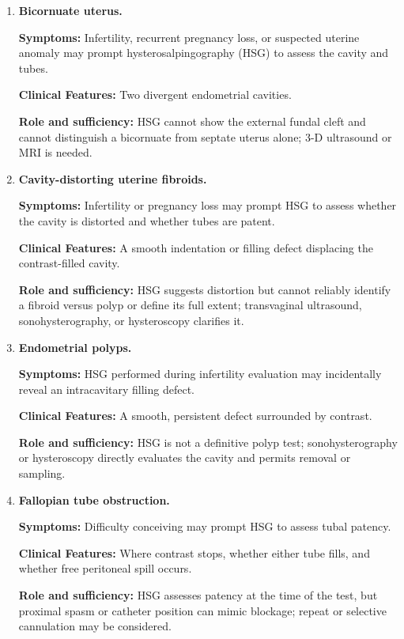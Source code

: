 \begin{enumerate}[leftmargin=*,itemsep=0.45em,topsep=0.4em]
\item \textbf{Bicornuate uterus.}\par\noindent\textbf{Symptoms:} Infertility, recurrent pregnancy loss, or suspected uterine anomaly may prompt hysterosalpingography (HSG) to assess the cavity and tubes.\par\noindent\textbf{Clinical Features:} Two divergent endometrial cavities.\par\noindent\textbf{Role and sufficiency:} HSG cannot show the external fundal cleft and cannot distinguish a bicornuate from septate uterus alone; 3-D ultrasound or MRI is needed.
\item \textbf{Cavity-distorting uterine fibroids.}\par\noindent\textbf{Symptoms:} Infertility or pregnancy loss may prompt HSG to assess whether the cavity is distorted and whether tubes are patent.\par\noindent\textbf{Clinical Features:} A smooth indentation or filling defect displacing the contrast-filled cavity.\par\noindent\textbf{Role and sufficiency:} HSG suggests distortion but cannot reliably identify a fibroid versus polyp or define its full extent; transvaginal ultrasound, sonohysterography, or hysteroscopy clarifies it.
\item \textbf{Endometrial polyps.}\par\noindent\textbf{Symptoms:} HSG performed during infertility evaluation may incidentally reveal an intracavitary filling defect.\par\noindent\textbf{Clinical Features:} A smooth, persistent defect surrounded by contrast.\par\noindent\textbf{Role and sufficiency:} HSG is not a definitive polyp test; sonohysterography or hysteroscopy directly evaluates the cavity and permits removal or sampling.
\item \textbf{Fallopian tube obstruction.}\par\noindent\textbf{Symptoms:} Difficulty conceiving may prompt HSG to assess tubal patency.\par\noindent\textbf{Clinical Features:} Where contrast stops, whether either tube fills, and whether free peritoneal spill occurs.\par\noindent\textbf{Role and sufficiency:} HSG assesses patency at the time of the test, but proximal spasm or catheter position can mimic blockage; repeat or selective cannulation may be considered.

\end{enumerate}
